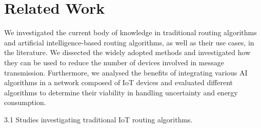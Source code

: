 \section{Related Work}
\label{sec:rel-work}


We investigated the current body of knowledge in traditional routing algorithms and artificial intelligence-based routing 
algorithms, as well as their use cases, in the literature. We dissected the widely adopted methods and investigated how they
can be used to reduce the number of devices involved in message transmission. Furthermore, we analysed the benefits of 
integrating various AI algorithms in a network composed of IoT devices and evaluated different algorithms to determine their 
viability in handling uncertainty and energy consumption.

3.1 Studies investigating traditional IoT routing algorithms.

